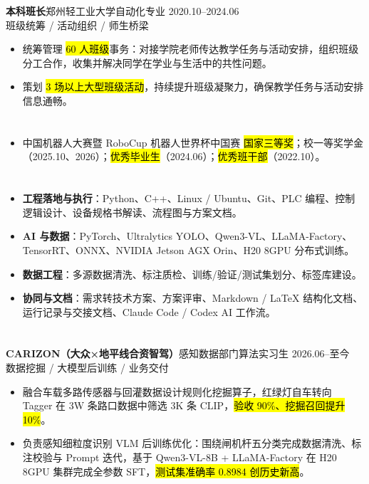 \vspace{0.30em}
{\small\textbf{本科班长}}\quad 郑州轻工业大学自动化专业 \hfill {2020.10--2024.06} \\
{\scriptsize\color{WHU_Blue} 班级统筹 / 活动组织 / 师生桥梁}
\begin{itemize}
    \item 统筹管理 \hl{60 人班级}事务：对接学院老师传达教学任务与活动安排，组织班级分工合作，收集并解决同学在学业与生活中的共性问题。
    \item 策划 \hl{3 场以上大型班级活动}，持续提升班级凝聚力，确保教学任务与活动安排信息通畅。
\end{itemize}

\section[荣誉奖项]{}
\begin{itemize}
    \item 中国机器人大赛暨 RoboCup 机器人世界杯中国赛 \hl{国家三等奖}；校一等奖学金（2025.10、2026）；\hl{优秀毕业生}（2024.06）；\hl{优秀班干部}（2022.10）。
\end{itemize}

\section[专业技能]{}
\begin{itemize}
    \item \textbf{工程落地与执行}：Python、C++、Linux / Ubuntu、Git、PLC 编程、控制逻辑设计、设备规格书解读、流程图与方案文档。
    \item \textbf{AI 与数据}：PyTorch、Ultralytics YOLO、Qwen3-VL、LLaMA-Factory、TensorRT、ONNX、NVIDIA Jetson AGX Orin、H20 8GPU 分布式训练。
    \item \textbf{数据工程}：多源数据清洗、标注质检、训练/验证/测试集划分、标签库建设。
    \item \textbf{协同与文档}：需求转技术方案、方案评审、Markdown / LaTeX 结构化文档、运行记录与交接文档、Claude Code / Codex AI 工作流。
\end{itemize}

\section[实习经历]{}
{\small\textbf{CARIZON（大众×地平线合资智驾）}}\quad 感知数据部门算法实习生 \hfill {2026.06--至今}\\
{\scriptsize\color{WHU_Blue} 数据挖掘 / 大模型后训练 / 业务交付}
\begin{itemize}
    \item 融合车载多路传感器与回灌数据设计规则化挖掘算子，红绿灯自车转向 Tagger 在 3W 条路口数据中筛选 3K 条 CLIP，\hl{验收 90\%、挖掘召回提升 10\%}。
    \item 负责感知细粒度识别 VLM 后训练优化：围绕闸机杆五分类完成数据清洗、标注校验与 Prompt 迭代，基于 Qwen3-VL-8B + LLaMA-Factory 在 H20 8GPU 集群完成全参数 SFT，\hl{测试集准确率 0.8984 创历史新高}。
\end{itemize}

